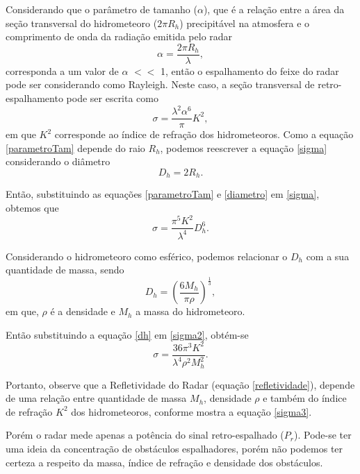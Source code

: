 Considerando que o parâmetro de tamanho ($\alpha$), que é a relação entre a área da seção transversal do hidrometeoro ($2\pi R_{h}$) precipitável na atmosfera e o comprimento de onda da radiação emitida pelo radar
\begin{equation}
\alpha = \dfrac{2\pi R_{h} }{\lambda},
\label{parametroTam} 
\end{equation}
corresponda a um valor de $\alpha$ $<<$ 1, então o espalhamento do feixe do radar pode ser considerando como Rayleigh. Neste caso, a seção transversal de retro-espalhamento pode ser escrita como 
\begin{equation}
\sigma = \dfrac{\lambda^2 \alpha^6}{\pi} K^2,
\label{sigma}
\end{equation}
em que $K^2$ corresponde ao índice de refração dos hidrometeoros. Como a equação \ref{parametroTam} depende do raio $R_h$, podemos reescrever a equação \ref{sigma} considerando o diâmetro 
\begin{equation}
D_h = 2R_h.
\label{diametro}
\end{equation}

Então, substituindo as equações \ref{parametroTam} e \ref{diametro} em \ref{sigma}, obtemos que
\begin{equation}
\sigma = \dfrac{\pi^5 K^2  }{ \lambda^4 } D_h^6.
\label{sigma2}
\end{equation}

Considerando o hidrometeoro como esférico, podemos relacionar o $D_h$ com a sua quantidade de massa, sendo  
\begin{equation}
D_h = \left( \dfrac{6 M_h}{\pi \rho} \right)^{\frac{1}{3}},
\label{dh}
\end{equation}
em que, $\rho$ é a densidade e $M_h$ a massa do hidrometeoro.

Então substituindo a equação \ref{dh} em \ref{sigma2}, obtém-se
\begin{equation}
\sigma = \dfrac{36 \pi^3 K^2  }{ \lambda^4 \rho^2 M_h^2} .
\label{sigma3}
\end{equation}

Portanto, observe que a Refletividade do Radar (equação  \ref{refletividade}), depende  de uma relação entre quantidade de massa $M_h$, densidade $\rho$ e também do índice de refração $K^2$ dos hidrometeoros, conforme mostra a equação \ref{sigma3}.

Porém o radar mede apenas a potência do sinal retro-espalhado ($P_r$). Pode-se ter uma ideia da concentração de obstáculos espalhadores, porém não podemos ter certeza a respeito da massa, índice de refração e densidade dos obstáculos. 

